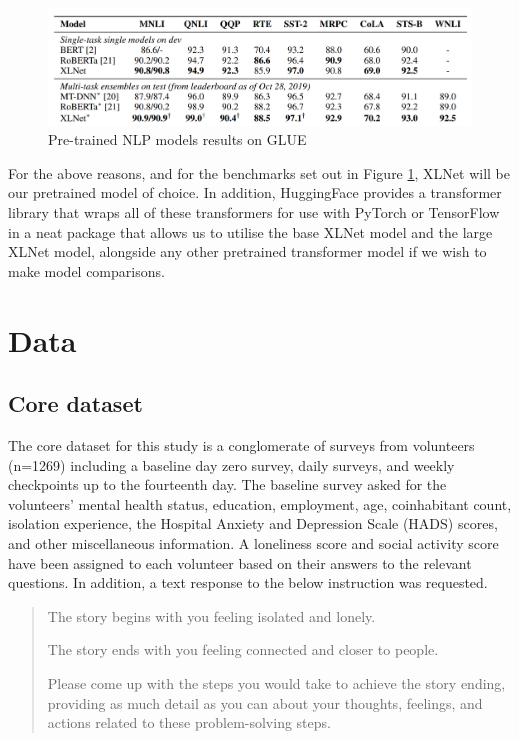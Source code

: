 \documentclass[12pt, a4paper]{article}
\begin{document}
\begin{figure}
	\includegraphics[scale=0.45]{benchmarks}
	\caption{Pre-trained NLP models results on GLUE}
	\label{benchmarks}
\end{figure}

For the above reasons, and for the benchmarks set out in Figure \ref{benchmarks}, XLNet will be our pretrained model of choice. In addition, HuggingFace \cite{Wolf2019HuggingFacesTS} provides a transformer library that wraps all of these transformers for use with PyTorch or TensorFlow in a neat package that allows us to utilise the base XLNet model and the large XLNet model, alongside any other pretrained transformer model if we wish to make model comparisons. 

\section{Data}

\subsection{Core dataset}
The core dataset for this study is a conglomerate of surveys from volunteers (n=1269) including a baseline day zero survey, daily surveys, and weekly checkpoints up to the fourteenth day. The baseline survey asked for the volunteers' mental health status, education, employment, age, coinhabitant count, isolation experience, the Hospital Anxiety and Depression Scale (HADS) scores, and other miscellaneous information. A loneliness score and social activity score have been assigned to each volunteer based on their answers to the relevant questions. In addition, a text response to the below instruction was requested. 

\begin{quote}
The story begins with you feeling isolated and lonely.

The story ends with you feeling connected and closer to people.

Please come up with the steps you would take to achieve the story ending, providing as much detail as you can about your thoughts, feelings, and actions related to these problem-solving steps.
\end{quote}
\end{document}
